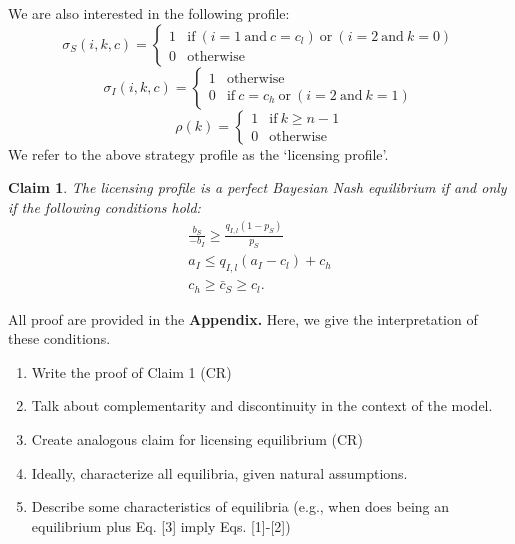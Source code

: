 \documentclass[11pt]{article}
\theoremstyle{plainCl1}
\newtheorem{Claim}{Claim}
\begin{document}
\noindent
We are also interested in the following profile:
\begin{equation}
\sigma_S(i,k,c) = \left\{
\begin{array}{ll}
1	&\text{if}~(i\!=\!1 ~\text{and}~ c\!=\!c_l)~\text{or}~(i\!=\!2~\text{and}~k\!=\!0)\\
0	&\text{otherwise}
\end{array}
\right.
\end{equation}
\begin{equation}
\sigma_I(i,k,c)= \left\{
\begin{array}{ll}
1	&\text{otherwise}\\
0	&\text{if}~ c\!=\!c_h~\text{or}~(i\!=\!2~\text{and}~k\!=\!1)
\end{array}
\right.
\end{equation}
\begin{equation}
\rho(k) = \left\{
\begin{array}{ll}
1	&\text{if}~k \ge n-1\\
0	&\text{otherwise}
\end{array}
\right.
\end{equation}
We refer to the above strategy profile as the `licensing profile'. 

\begin{Claim}
The licensing profile is a perfect Bayesian Nash equilibrium if and only if the following conditions hold:
\begin{equation}
\begin{array}{c}
\displaystyle \frac{b_S}{-b_I} \ge \frac{q_{I,l}(1\!-\!p_S)}{p_S}\\[0.4cm]
\displaystyle a_I \le q_{I,l}(a_I-c_l)+c_h\\[0.4cm]
\displaystyle  c_h \ge \bar{c}_S \ge c_l. 
\end{array}
\end{equation}
\end{Claim}

\noindent
All proof are provided in the {\bf Appendix.} Here, we give the interpretation of these conditions. \\

\begin{enumerate}
\item Write the proof of Claim 1 (CR)
\item Talk about complementarity and discontinuity in the context of the model.
\item Create analogous claim for licensing equilibrium (CR)
\item Ideally, characterize all equilibria, given natural assumptions. 
\item Describe some characteristics of equilibria (e.g., when does being an equilibrium plus Eq. [3] imply Eqs. [1]-[2])
\end{enumerate}
\end{document}
